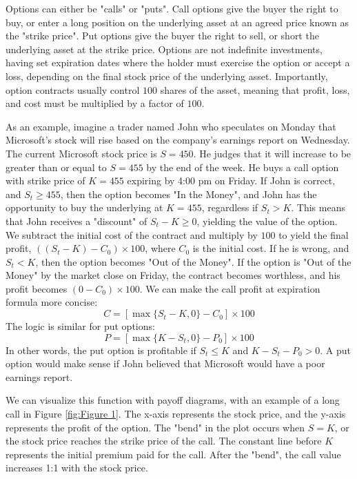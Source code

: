 \documentclass{article}
\begin{document}
\indent Options can either be "calls" or "puts". Call options give the buyer the right to buy, or enter a long position on the underlying asset at an agreed price known as the "strike price". Put options give the buyer the right to sell, or short the underlying asset at the strike price. Options are not indefinite investments, having set expiration dates where the holder must exercise the option or accept a loss, depending on the final stock price of the underlying asset. Importantly, option contracts usually control $100$ shares of the asset, meaning that profit, loss, and cost must be multiplied by a factor of $100$.

\indent As an example, imagine a trader named John who speculates on Monday that Microsoft's stock will rise based on the company's earnings report on Wednesday. The current Microsoft stock price is $S=450$. He judges that it will increase to be greater than or equal to $S=455$ by the end of the week. He buys a call option with strike price of $K=455$ expiring by 4:00 pm on Friday. If John is correct, and $S_t\geq455$, then the option becomes "In the Money", and John has the opportunity to buy the underlying at $K=455$, regardless if $S_t > K$. This means that John receives a "discount" of $S_t-K \geq 0$, yielding the value of the option. We subtract the initial cost of the contract and multiply by $100$ to yield the final profit, $((S_t-K)-C_0)\times100$, where $C_0$ is the initial cost. If he is wrong, and $S_t < K$, then the option becomes "Out of the Money". If the option is "Out of the Money" by the market close on Friday, the contract becomes worthless, and his profit becomes $(0-C_0)\times 100$. We can make the call profit at expiration formula more concise: 
$$ C = [\max\{S_t-K,0\}-C_0]\times100$$
The logic is similar for put options: 
$$ P = [\max\{K-S_t,0\}-P_0]\times100$$
In other words, the put option is profitable if $S_t \leq K$ and $K-S_t-P_0 > 0$. A put option would make sense if John believed that Microsoft would have a poor earnings report. 

\indent We can visualize this function with payoff diagrams, with an example of a long call in Figure \ref{fig:Figure 1}. The x-axis represents the stock price, and the y-axis represents the profit of the option. The "bend" in the plot occurs when $S=K$, or the stock price reaches the strike price of the call. The constant line before $K$ represents the initial premium paid for the call. After the "bend", the call value increases 1:1 with the stock price. 
\end{document}
